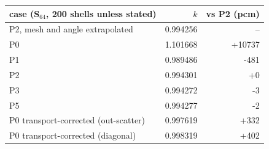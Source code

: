 \begin{tabular}{lrr}
\hline
case (S$_{64}$, 200 shells unless stated) & $k$ & vs P2 (pcm)\\
\hline
P2, mesh and angle extrapolated & 0.994256 & --\\
P0 & 1.101668 & +10737\\
P1 & 0.989486 & -481\\
P2 & 0.994301 & +0\\
P3 & 0.994272 & -3\\
P5 & 0.994277 & -2\\
P0 transport-corrected (out-scatter) & 0.997619 & +332\\
P0 transport-corrected (diagonal) & 0.998319 & +402\\
\hline
\end{tabular}
